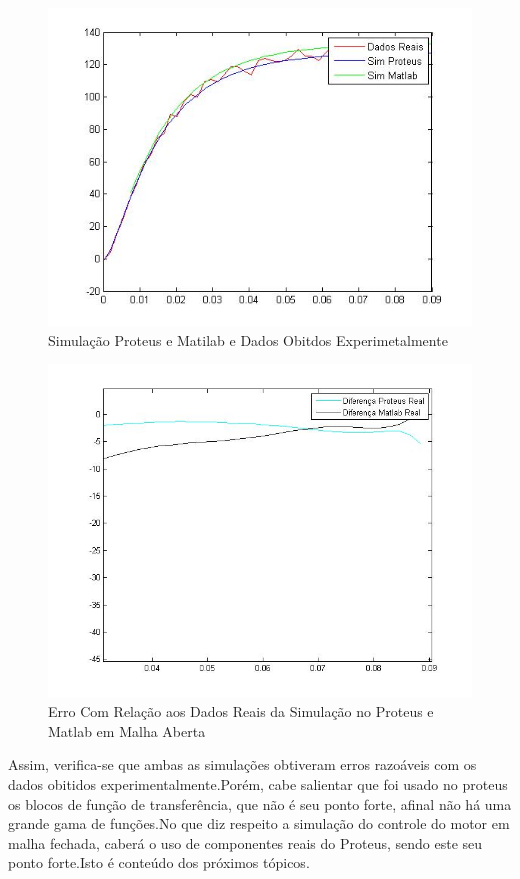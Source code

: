 \documentclass[11pt, a4paper, oneside]{article}
\begin{document}
\begin{figure}[h!]
\centering
\includegraphics[width=.7\textwidth]{Dados_reais_matlab_proteus_malha_aberta.jpg}
\caption{Simulação Proteus e Matilab e Dados Obitdos Experimetalmente}
\label{dados reais e simulacao}
\end{figure}

\begin{figure}[h!]
\centering
\includegraphics[width=.7\textwidth]{erro_malha_aberta.jpg}
\caption{Erro Com Relação aos Dados Reais da Simulação no Proteus e Matlab em Malha Aberta}
\label{erro Malhaaberta}
\end{figure}

Assim, verifica-se que ambas as simulações obtiveram erros razoáveis com os dados obitidos experimentalmente.Porém, cabe salientar que foi usado no proteus os blocos de função de transferência, que não é seu ponto forte, afinal não há uma grande gama de funções.No que diz respeito a simulação do controle do motor em malha fechada, caberá o uso de componentes reais do Proteus, sendo este seu ponto forte.Isto é conteúdo dos próximos tópicos.

\newpage
\end{document}
